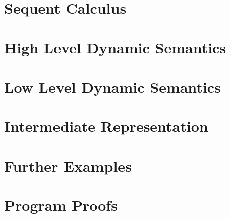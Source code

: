 \chapter{Sequent Calculus}\label{sec:fragment}


\chapter{High Level Dynamic Semantics}\label{sec:hld}


\chapter{Low Level Dynamic Semantics}\label{sec:lld}


\chapter{Intermediate Representation}\label{appendix:vm}

\chapter{Further Examples}

\chapter{Program Proofs}

